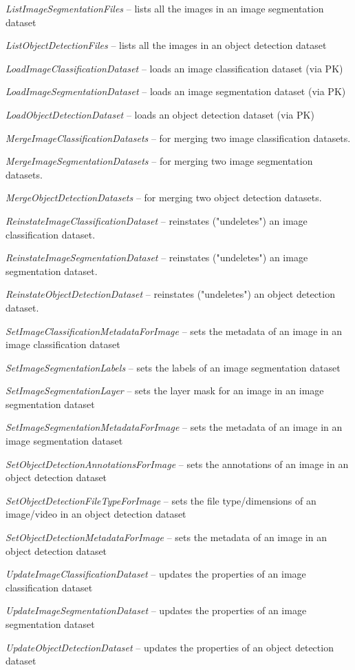 \documentclass[a4paper]{book}
\begin{document}
\begin{tight_itemize}
  \item \textit{ListImageSegmentationFiles} -- lists all the images in an image segmentation dataset
  \item \textit{ListObjectDetectionFiles} -- lists all the images in an object detection dataset
  \item \textit{LoadImageClassificationDataset} -- loads an image classification dataset (via PK)
  \item \textit{LoadImageSegmentationDataset} -- loads an image segmentation dataset (via PK)
  \item \textit{LoadObjectDetectionDataset} -- loads an object detection dataset (via PK)
  \item \textit{MergeImageClassificationDatasets} -- for merging two image classification datasets.
  \item \textit{MergeImageSegmentationDatasets} -- for merging two image segmentation datasets.
  \item \textit{MergeObjectDetectionDatasets} -- for merging two object detection datasets.
  \item \textit{ReinstateImageClassificationDataset} -- reinstates ("undeletes") an image classification dataset.
  \item \textit{ReinstateImageSegmentationDataset} -- reinstates ("undeletes") an image segmentation dataset.
  \item \textit{ReinstateObjectDetectionDataset} -- reinstates ("undeletes") an object detection dataset.
  \item \textit{SetImageClassificationMetadataForImage} -- sets the metadata of an image in an image classification dataset
  \item \textit{SetImageSegmentationLabels} -- sets the labels of an image segmentation dataset
  \item \textit{SetImageSegmentationLayer} -- sets the layer mask for an image in an image segmentation dataset
  \item \textit{SetImageSegmentationMetadataForImage} -- sets the metadata of an image in an image segmentation dataset
  \item \textit{SetObjectDetectionAnnotationsForImage} -- sets the annotations of an image in an object detection dataset
  \item \textit{SetObjectDetectionFileTypeForImage} -- sets the file type/dimensions of an image/video in an object detection dataset
  \item \textit{SetObjectDetectionMetadataForImage} -- sets the metadata of an image in an object detection dataset
  \item \textit{UpdateImageClassificationDataset} -- updates the properties of an image classification dataset
  \item \textit{UpdateImageSegmentationDataset} -- updates the properties of an image segmentation dataset
  \item \textit{UpdateObjectDetectionDataset} -- updates the properties of an object detection dataset
\end{tight_itemize}
\end{document}
